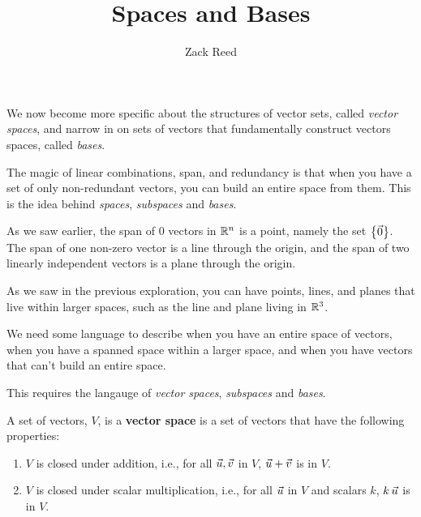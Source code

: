 \documentclass{ximera}
\author{Zack Reed}
\title{Spaces and Bases}
\begin{document}
\begin{abstract}

\end{abstract}
\maketitle

We now become more specific about the structures of vector sets, called \emph{vector spaces}, and narrow in on sets of vectors that fundamentally construct vectors spaces, called \emph{bases}.

\begin{exploration}
  
  The magic of linear combinations, span, and redundancy is that when you have a set of only non-redundant vectors, you can build an entire space from them. This is the idea behind \emph{spaces}, \emph{subspaces} and \emph{bases}. 

  As we saw earlier, the span of 0 vectors in $\mathbb{R}^n$ is a point, namely the set $\left\{\vec{0}\right\}$. The span of one non-zero vector is a line
through the origin, and the span of two linearly independent vectors
is a plane through the origin.

As we saw in the previous exploration, you can have points, lines, and planes that live within larger spaces, such as the line and plane living in $\mathbb{R}^3$.

We need some language to describe when you have an entire space of vectors, when you have a spanned space within a larger space, and when you have vectors that can't build an entire space.

This requires the langauge of \emph{vector spaces}, \emph{subspaces} and \emph{bases}.



  \begin{definition}

    A set of vectors, $V$, is a \textbf{vector space} is a set of vectors that have the following properties:

    \begin{enumerate}
    
      \item $V$ is closed under addition, i.e., for all $\vec{u},\vec{v}$ in $V$, $\vec{u}+\vec{v}$ is in $V$.
      
      \item $V$ is closed under scalar multiplication, i.e., for all $\vec{u}$ in $V$ and scalars $k$, $k\,\vec{u}$ is in $V$.
      

\end{enumerate}
\end{definition}
\end{exploration}
\end{document}
